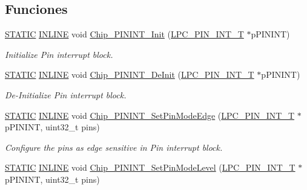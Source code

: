 \subsection*{Funciones}
\begin{DoxyCompactItemize}
\item 
\hyperlink{group___l_p_c___types___public___macros_ga10b2d890d871e1489bb02b7e70d9bdfb}{S\+T\+A\+T\+IC} \hyperlink{spifi__18xx__43xx_8h_a2eb6f9e0395b47b8d5e3eeae4fe0c116}{I\+N\+L\+I\+NE} void \hyperlink{group___p_i_n_i_n_t__18_x_x__43_x_x_ga7d5f017f430fbecd18810fa08e7baef0}{Chip\+\_\+\+P\+I\+N\+I\+N\+T\+\_\+\+Init} (\hyperlink{struct_l_p_c___p_i_n___i_n_t___t}{L\+P\+C\+\_\+\+P\+I\+N\+\_\+\+I\+N\+T\+\_\+T} $\ast$p\+P\+I\+N\+I\+NT)
\begin{DoxyCompactList}\small\item\em Initialize Pin interrupt block. \end{DoxyCompactList}\item 
\hyperlink{group___l_p_c___types___public___macros_ga10b2d890d871e1489bb02b7e70d9bdfb}{S\+T\+A\+T\+IC} \hyperlink{spifi__18xx__43xx_8h_a2eb6f9e0395b47b8d5e3eeae4fe0c116}{I\+N\+L\+I\+NE} void \hyperlink{group___p_i_n_i_n_t__18_x_x__43_x_x_gaffd71b90ad59df213ae6ce90a4687727}{Chip\+\_\+\+P\+I\+N\+I\+N\+T\+\_\+\+De\+Init} (\hyperlink{struct_l_p_c___p_i_n___i_n_t___t}{L\+P\+C\+\_\+\+P\+I\+N\+\_\+\+I\+N\+T\+\_\+T} $\ast$p\+P\+I\+N\+I\+NT)
\begin{DoxyCompactList}\small\item\em De-\/\+Initialize Pin interrupt block. \end{DoxyCompactList}\item 
\hyperlink{group___l_p_c___types___public___macros_ga10b2d890d871e1489bb02b7e70d9bdfb}{S\+T\+A\+T\+IC} \hyperlink{spifi__18xx__43xx_8h_a2eb6f9e0395b47b8d5e3eeae4fe0c116}{I\+N\+L\+I\+NE} void \hyperlink{group___p_i_n_i_n_t__18_x_x__43_x_x_ga07505a16cf0d80d7dde607ebab062534}{Chip\+\_\+\+P\+I\+N\+I\+N\+T\+\_\+\+Set\+Pin\+Mode\+Edge} (\hyperlink{struct_l_p_c___p_i_n___i_n_t___t}{L\+P\+C\+\_\+\+P\+I\+N\+\_\+\+I\+N\+T\+\_\+T} $\ast$p\+P\+I\+N\+I\+NT, uint32\+\_\+t pins)
\begin{DoxyCompactList}\small\item\em Configure the pins as edge sensitive in Pin interrupt block. \end{DoxyCompactList}\item 
\hyperlink{group___l_p_c___types___public___macros_ga10b2d890d871e1489bb02b7e70d9bdfb}{S\+T\+A\+T\+IC} \hyperlink{spifi__18xx__43xx_8h_a2eb6f9e0395b47b8d5e3eeae4fe0c116}{I\+N\+L\+I\+NE} void \hyperlink{group___p_i_n_i_n_t__18_x_x__43_x_x_ga4a9efb559231903508b66858a43b552d}{Chip\+\_\+\+P\+I\+N\+I\+N\+T\+\_\+\+Set\+Pin\+Mode\+Level} (\hyperlink{struct_l_p_c___p_i_n___i_n_t___t}{L\+P\+C\+\_\+\+P\+I\+N\+\_\+\+I\+N\+T\+\_\+T} $\ast$p\+P\+I\+N\+I\+NT, uint32\+\_\+t pins)

\end{DoxyCompactItemize}
